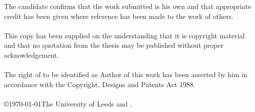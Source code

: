 
\begin{ipstatement} %
The candidate confirms that the work submitted is his own and that
appropriate credit has been given where reference has been made to
the work of others.
\\
\\
This copy has been supplied on the understanding that it is copyright
material and that no quotation from the thesis may be published
without proper acknowledgement.
\\
\\
The right of \theAuthor to be identified as Author of this work
has been asserted by him in accordance with the Copyright, Designs
and Patents Act 1988.
\\
\\
\copyright \yeardate\today The University of Leeds and \theAuthor.

\end{ipstatement}


